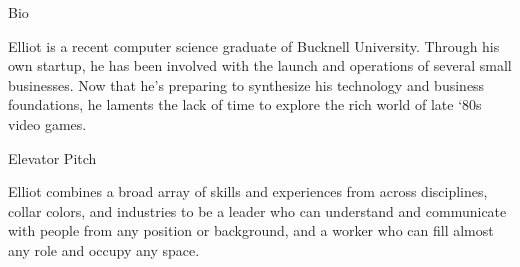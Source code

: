 \documentclass{resume} %
\begin{document}

\begin{rSection}{Bio}

Elliot is a recent computer science graduate of Bucknell University. Through his own startup, he has been involved with the launch and operations of several small businesses. Now that he’s preparing to synthesize his technology and business foundations, he laments the lack of time to explore the rich world of late ‘80s video games. \\

\end{rSection}


\begin{rSection}{Elevator Pitch}

Elliot combines a broad array of skills and experiences from across disciplines, collar colors, and industries to be a leader who can understand and communicate with people from any position or background, and a worker who can fill almost any role and occupy any space. \\

\end{rSection}

\end{document}
